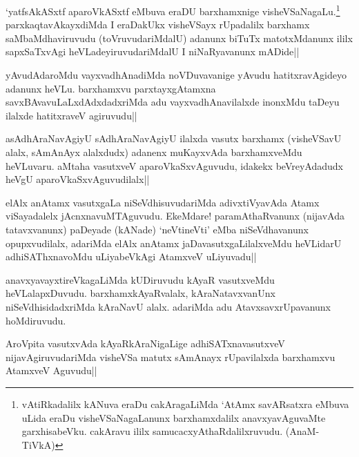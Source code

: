 
\begin{artha}
`yatfsAkASxtf aparoVkASxtf eMbuva eraDU barxhamxnige visheVSaNagaLu.\footnote[1]{vAtiRkadalilx kANuva eraDu cakAragaLiMda `AtAmx savARsatxra eMbuva uLida eraDu visheVSaNagaLanunx barxhamxdalilx anavxyavAguvaMte garxhisabeVku. cakAravu ililx samucacxyAthaRdalilxruvudu. (AnaM-TiVkA)} parxkaqtavAkayxdiMda I eraDakUkx visheVSayx rUpadalilx barxhamx saMbaMdhaviruvudu (toVruvudariMdalU) adanunx biTuTx matotxMdanunx ililx sapxSaTxvAgi heVLadeyiruvudariMdalU I niNaRyavanunx mADide|| 
\end{artha}


\begin{artha}
yAvudAdaroMdu vayxvadhAnadiMda noVDuvavanige yAvudu hatitxravAgideyo adanunx heVLu. barxhamxvu parxtayxgAtamxna savxBAvavuLaLxdAdxdadxriMda adu vayxvadhAnavilalxde inonxMdu taDeyu ilalxde hatitxraveV agiruvudu|| 
\end{artha}%


\begin{artha}
asAdhAraNavAgiyU sAdhAraNavAgiyU ilalxda vasutx barxhamx (visheVSavU alalx, sAmAnAyx alalxdudx) adanenx muKayxvAda barxhamxveMdu heVLuvaru. aMtaha vasutxveV aparoVkaSxvAguvudu, idakekx beVreyAdadudx heVgU aparoVkaSxvAguvudilalx||
\end{artha}


\begin{artha}
elAlx anAtamx vasutxgaLa niSeVdhisuvudariMda adivxtiVyavAda Atamx viSayadalelx jAcnxnavuMTAguvudu. EkeMdare! paramAthaRvanunx (nijavAda tatavxvanunx) paDeyade (kANade) `neVtineVti' eMba niSeVdhavanunx opupxvudilalx, adariMda elAlx anAtamx jaDavasutxgaLilalxveMdu heVLidarU adhiSAThxnavoMdu uLiyabeVkAgi AtamxveV uLiyuvadu||
\end{artha}

\begin{artha}
\stext anavxyavayxtireVkagaLiMda kUDiruvudu kAyaR vasutxveMdu heVLalapxDuvudu. barxhamxkAyaRvalalx, kAraNatavxvanUnx niSeVdhisidadxriMda kAraNavU alalx. adariMda adu AtavxsavxrUpavanunx hoMdiruvudu.

AroVpita vasutxvAda kAyaRkAraNigaLige adhiSATxnavasutxveV nijavAgiruvudariMda visheVSa matutx sAmAnayx rUpavilalxda barxhamxvu AtamxveV Aguvudu||
\end{artha}%

